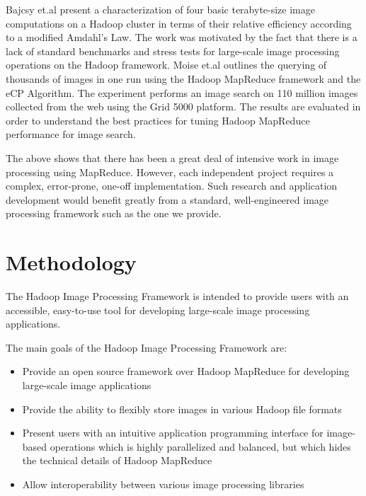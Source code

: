 \documentclass[conference]{IEEEtran}
\begin{document}
Bajcsy et.al \cite{Bajcsy2013} present a characterization of four
basic terabyte-size image computations on a Hadoop cluster in terms of
their relative efficiency according to a modified Amdahl's Law. The
work was motivated by the fact that there is a lack of standard
benchmarks and stress tests for large-scale image processing
operations on the Hadoop framework. Moise et.al \cite{Moise2013}
outlines the querying of thousands of images in one run using the
Hadoop MapReduce framework and the eCP Algorithm. The experiment
performs an image search on 110 million images collected from the web
using the Grid 5000 platform. The results are evaluated in order to
understand the best practices for tuning Hadoop MapReduce performance
for image search.

The above shows that there has been a great deal of intensive work in
image processing using MapReduce.  However, each independent project
requires a complex, error-prone, one-off implementation.  Such
research and application development would benefit greatly from a
standard, well-engineered image processing framework such as the one
we provide.
	
\section{Methodology}
\label{methodology}
The Hadoop Image Processing Framework is intended to provide users
with an accessible, easy-to-use tool for developing large-scale image
processing applications.

The main goals of the Hadoop Image Processing Framework are:
\begin{itemize}
\item Provide an open source framework over Hadoop MapReduce for
  developing large-scale image applications
\item Provide the ability to flexibly store images in various Hadoop
  file formats
\item Present users with an intuitive application programming
  interface for image-based operations which is highly parallelized
  and balanced, but which hides the technical details of Hadoop
  MapReduce
\item Allow interoperability between various image processing
  libraries
\end{itemize}
\end{document}
